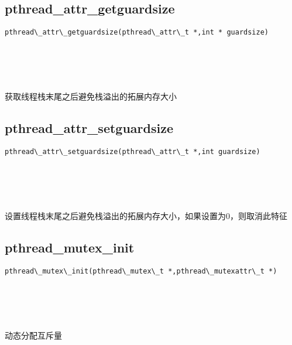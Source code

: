 \documentclass[10pt,a4paper]{article}
\begin{document}
\subsection{pthread\_attr\_getguardsize}
\begin{spacing}{2.0}
\lstset{language=C,numbers=none}
\begin{lstlisting}
pthread\_attr\_getguardsize(pthread\_attr\_t *,int * guardsize)
\end{lstlisting}
{\large\color[rgb]{0.2,0.4,0.6}{*:}} \\
{\large\color[rgb]{0.2,0.4,0.6}{guardsize:}}
\paragraph{ \ \ }获取线程栈末尾之后避免栈溢出的拓展内存大小
\end{spacing}

\subsection{pthread\_attr\_setguardsize}
\begin{spacing}{2.0}
\lstset{language=C,numbers=none}
\begin{lstlisting}
pthread\_attr\_setguardsize(pthread\_attr\_t *,int guardsize)
\end{lstlisting}
{\large\color[rgb]{0.2,0.4,0.6}{*:}} \\
{\large\color[rgb]{0.2,0.4,0.6}{guardsize:}}
\paragraph{ \ \ }设置线程栈末尾之后避免栈溢出的拓展内存大小，如果设置为0，则取消此特征
\end{spacing}

\subsection{pthread\_mutex\_init}
\begin{spacing}{2.0}
\lstset{language=C,numbers=none}
\begin{lstlisting}
pthread\_mutex\_init(pthread\_mutex\_t *,pthread\_mutexattr\_t *)
\end{lstlisting}
{\large\color[rgb]{0.2,0.4,0.6}{*:}} \\
{\large\color[rgb]{0.2,0.4,0.6}{*:}}
\paragraph{ \ \ }动态分配互斥量
\end{spacing}
\end{document}
